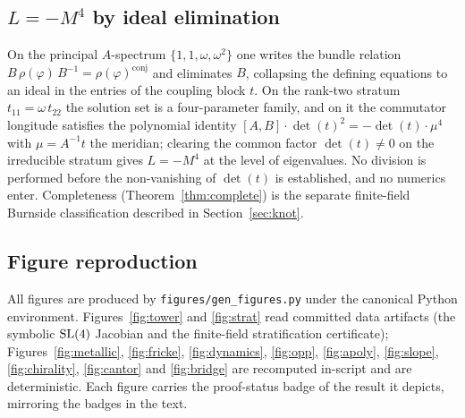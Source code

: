 \subsection{$L=-M^4$ by ideal elimination}
\label{app:m4l}

On the principal $A$-spectrum $\{1,1,\omega,\omega^2\}$ one writes the bundle relation
$B\,\rho(\varphi)\,B^{-1}=\rho(\varphi)^{\text{conj}}$ and eliminates $B$, collapsing the
defining equations to an ideal in the entries of the coupling block $t$. On the
rank-two stratum $t_{11}=\omega\,t_{22}$ the solution set is a four-parameter family, and
on it the commutator longitude satisfies the polynomial identity
$[A,B]\cdot\det(t)^2=-\det(t)\cdot\mu^4$ with $\mu=A^{-1}t$ the meridian; clearing the
common factor $\det(t)\ne0$ on the irreducible stratum gives $L=-M^4$ at the level of
eigenvalues. No division is performed before the non-vanishing of $\det(t)$ is established,
and no numerics enter. Completeness (Theorem~\ref{thm:complete}) is the separate
finite-field Burnside classification described in Section~\ref{sec:knot}.

\subsection{Figure reproduction}
\label{app:figs}

All figures are produced by \texttt{figures/gen\_figures.py} under the canonical Python
environment. Figures~\ref{fig:tower} and \ref{fig:strat} read committed data artifacts
(the symbolic $\mathrm{SL}(4)$ Jacobian and the finite-field stratification certificate);
Figures~\ref{fig:metallic}, \ref{fig:fricke}, \ref{fig:dynamics}, \ref{fig:opp},
\ref{fig:apoly}, \ref{fig:slope}, \ref{fig:chirality}, \ref{fig:cantor} and
\ref{fig:bridge} are recomputed in-script and are deterministic. Each figure carries the
proof-status badge of the result it depicts, mirroring the badges in the text.

